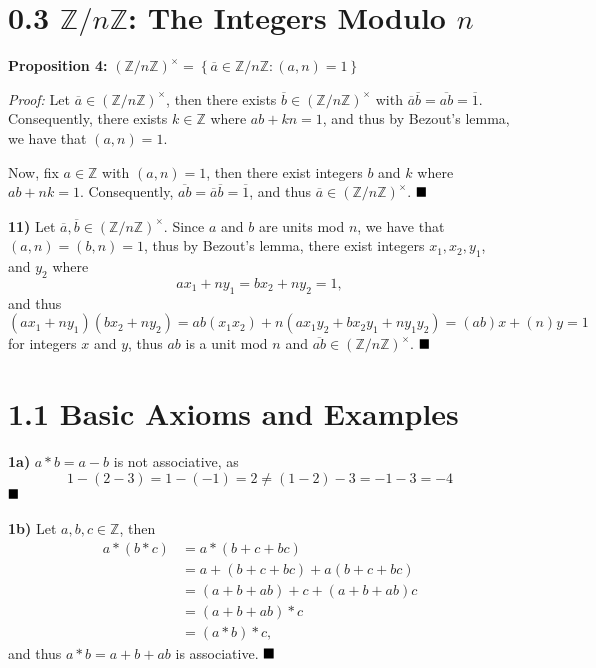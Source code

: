 \documentclass[12pt]{article}
\newcommand{\Z}{\mathbb{Z}}
\newcommand{\braceb}[1]{\left\{#1\right\}}
\newcommand{\done}{\ensuremath{\strut\hfill\blacksquare}}
\begin{document}
\pagestyle{fancy}

\setlength{\parindent}{0in}
\setlength{\parskip}{0.1in}

\section*{0.3 \( \Z / n\Z \): The Integers Modulo \( n \)}

\textbf{Proposition 4:}
\(
	(\Z / n\Z)^\times
	= \braceb{\overline{a} \in \Z / n\Z : (a, n) = 1}
\)

\textit{Proof:}
Let \( \overline{a} \in (\Z / n\Z)^\times \), then there exists
\( \overline{b} \in (\Z / n\Z)^\times \) with
\( \overline{a}\overline{b} = \overline{ab} = \overline{1} \).
Consequently, there exists \( k \in \Z \) where \( ab + kn = 1\), and thus by
Bezout's lemma, we have that \( (a, n) = 1 \).

Now, fix \( a \in \Z \) with \( (a, n) = 1 \), then there exist integers
\( b \) and \( k \) where \( ab + nk = 1 \).
Consequently, \( \overline{ab} = \overline{a}\overline{b} = \overline{1} \),
and thus \( \overline{a} \in (\Z / n\Z)^\times \).
\done

\textbf{11)}
Let \( \overline{a}, \overline{b} \in (\Z / n\Z)^\times \).
Since \( a \) and \( b \) are units mod \( n \), we have that
\( (a, n) = (b, n) = 1 \), thus by Bezout's lemma, there exist integers
\( x_1, x_2, y_1 \), and \( y_2 \) where
\[
	ax_1 + ny_1 = bx_2 + ny_2 = 1,
\]
and thus
\[
	(ax_1 + ny_1)(bx_2 + ny_2)
	= ab(x_1x_2) + n(ax_1y_2 + bx_2y_1 + ny_1y_2)
	= (ab)x + (n)y
	= 1
\]
for integers \( x \) and \( y \), thus \( ab \) is a unit mod \( n \) and
\( \overline{ab} \in (\Z / n\Z)^\times \).
\done

\section*{1.1 Basic Axioms and Examples}

\textbf{1a)}
\( a * b = a - b \) is not associative, as
\[
	1 - (2 - 3)
	= 1 - (-1)
	= 2
	\ne (1 - 2) - 3
	= -1 - 3
	= -4
\]
\done

\textbf{1b)}
Let \( a, b, c \in \Z \), then
\begin{align*}
	a * (b * c)
	& = a * (b + c + bc) \\
	& = a + (b + c + bc) + a(b + c + bc) \\
	& = (a + b + ab) + c + (a + b + ab)c \\
	& = (a + b + ab) * c \\
	& = (a * b) * c,
\end{align*}
and thus \( a * b = a + b + ab \) is associative.
\done
\end{document}
